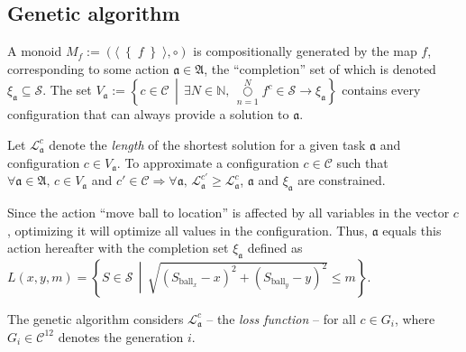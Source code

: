 \subsection{Genetic algorithm}
A monoid \(M_f:=\left(\langle \right\{ f \left\} \rangle,\circ\right)\) is compositionally generated by the map \(f\), corresponding to some action \(\mathfrak{a}\in\mathfrak{A}\), the ``completion'' set of which is denoted \(\xi_\mathfrak{a}\subseteq\mathcal{S}\). The set \(V_\mathfrak{a} := \left\{ c\in\mathcal{C} \,\middle|\, \exists N\in\mathbb{N},\, \overset{N}{\underset{n=1}\bigcirc} f^c \in \mathcal{S} \to \xi_\mathfrak{a} \right\}\) contains every configuration that can always provide a solution to \(\mathfrak{a}\).


Let \(\mathscr{L}^c_\mathfrak{a}\) denote the \textit{length} of the shortest solution for a given task \(\mathfrak{a}\) and configuration \(c\in V_\mathfrak{a}\). To approximate a configuration \(c\in\mathcal{C}\) such that \( \forall \mathfrak{a}\in\mathfrak{A},\, c\in V_\mathfrak{a} \) and \(c'\in\mathcal{C} \Rightarrow \forall \mathfrak{a},\, \mathscr{L}^{c'}_\mathfrak{a} \ge \mathscr{L}^{c}_\mathfrak{a}\), \(\mathfrak{a}\) and \(\xi_\mathfrak{a}\) are constrained.

Since the action ``move ball to location'' is affected by all variables in the vector \(c\), optimizing it will optimize all values in the configuration. Thus, \(\mathfrak{a}\) equals this action hereafter with the completion set \(\xi_\mathfrak{a}\) defined as \(L(x,y,m) = \left\{ S \in \mathcal{S} \,\middle|\, \sqrt{ \left(S_{\text{ball}_x} - x\right)^2 + \left(S_{\text{ball}_y} - y\right)^2 } \le m \right\}\).

The genetic algorithm considers \(\mathscr{L}^{c}_\mathfrak{a}\) -- the \textit{loss function} -- for all \(c\in G_i\), where \(G_i\in\mathcal{C}^{12}\) denotes the generation \(i\).


